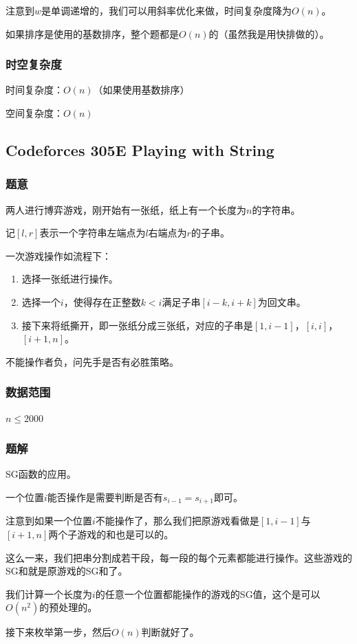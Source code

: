 \documentclass{ctexart}
\begin{document}
注意到$w$是单调递增的，我们可以用斜率优化来做，时间复杂度降为$O(n)$。

如果排序是使用的基数排序，整个题都是$O(n)$的（虽然我是用快排做的）。
\subsubsection{时空复杂度}
时间复杂度：$O(n)$（如果使用基数排序）

空间复杂度：$O(n)$
\subsection{Codeforces 305E Playing with String}
\subsubsection{题意}
两人进行博弈游戏，刚开始有一张纸，纸上有一个长度为$n$的字符串。

记$[l,r]$表示一个字符串左端点为$l$右端点为$r$的子串。

一次游戏操作如流程下：

\begin{enumerate}
\item 选择一张纸进行操作。
\item 选择一个$i$，使得存在正整数$k < i$满足子串$[i-k,i+k]$为回文串。
\item 接下来将纸撕开，即一张纸分成三张纸，对应的子串是$[1,i-1]$，$[i,i]$，$[i+1,n]$。
\end{enumerate}

不能操作者负，问先手是否有必胜策略。
\subsubsection{数据范围}
$n \le 2000$
\subsubsection{题解}
SG函数的应用。

一个位置$i$能否操作是需要判断是否有$s_{i-1}=s_{i+1}$即可。

注意到如果一个位置$i$不能操作了，那么我们把原游戏看做是$[1,i-1]$与$[i+1,n]$两个子游戏的和也是可以的。

这么一来，我们把串分割成若干段，每一段的每个元素都能进行操作。这些游戏的SG和就是原游戏的SG和了。

我们计算一个长度为$i$的任意一个位置都能操作的游戏的SG值，这个是可以$O(n^2)$的预处理的。

接下来枚举第一步，然后$O(n)$判断就好了。
\end{document}
